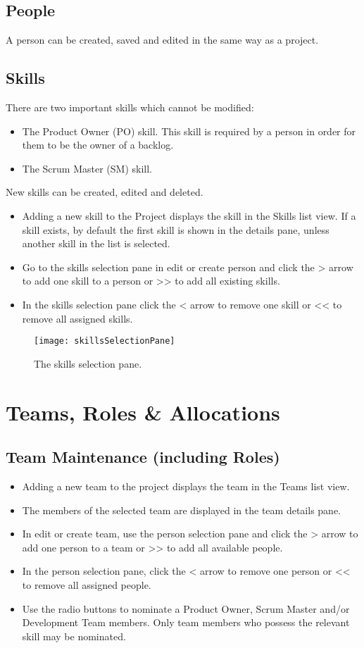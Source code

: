 \documentclass[11pt,fleqn]{book} %
\begin{document}
\subsection{People}
A person can be created, saved and edited in the same way as a project.
\subsection{Skills}
There are two important skills which cannot be modified: 
\begin{itemize}
  \item The Product Owner (PO) skill.
    This skill is required by a person in order for them to be the owner of a backlog. 
  \item The Scrum Master (SM) skill.
\end{itemize}
New skills can be created, edited and deleted.
\begin{itemize}
  \item Adding a new skill to the Project displays the skill in the Skills list view. If a skill exists, by default the
  first skill is shown in the details pane, unless another skill in the list is selected.
  \item Go to the skills selection pane in edit or create person and click the > arrow to add one skill to a person
  or >> to add all existing skills.
  \item In the skills selection pane click the < arrow to remove one skill or << to remove all assigned skills.
\end{itemize}

\begin{figure}[H]
  \centering
  \texttt{[image: skillsSelectionPane]}
  \caption{The skills selection pane.\label{skillsSelectionPane}}
\end{figure}

\section{Teams, Roles \& Allocations}
\subsection{Team Maintenance (including Roles)}
\begin{itemize}
  \item Adding a new team to the project displays the team in the Teams list view.
  \item The members of the selected team are displayed in the team details pane.
  \item In edit or create team, use the person selection pane and click the > arrow to add one person to a team
  or >> to add all available people.
  \item In the person selection pane, click the < arrow to remove one person or << to remove all assigned people.
  \item Use the radio buttons to nominate a Product Owner, Scrum Master and/or Development Team members. Only team members who
   possess the relevant skill may be nominated.
\end{itemize}
\end{document}
